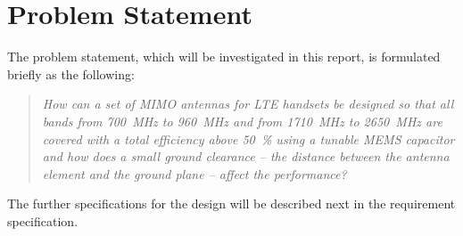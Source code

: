 \section{Problem Statement}
\label{sec:problem_statement}
The problem statement, which will be investigated in this report, is formulated briefly as the following:
\begin{quote}
    \itshape
    How can a set of MIMO antennas for LTE handsets be designed so that all bands from \SI{700}{MHz} to \SI{960}{MHz} and from \SI{1710}{MHz} to \SI{2650}{MHz} are covered with a total efficiency above \SI{50}{\%} using a tunable MEMS capacitor and how does a small ground clearance -- the distance between the antenna element and the ground plane -- affect the performance?
\end{quote}
The further specifications for the design will be described next in the requirement specification.
